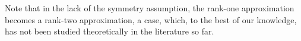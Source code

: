 \documentclass[draft, onecolumn, 12pt]{IEEEtran}
\begin{document}
Note that in the lack of the symmetry assumption, the rank-one approximation becomes a rank-two approximation, a case, which, to the best of our knowledge, has not been studied theoretically in the literature so far.


\end{document}
